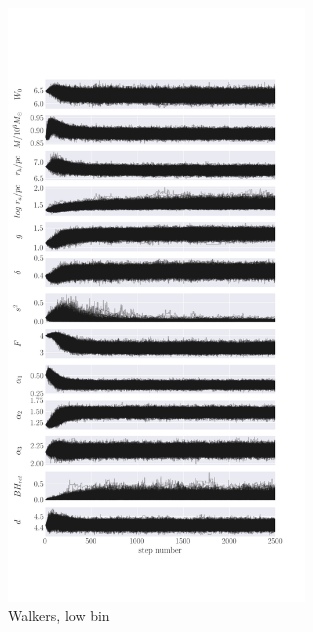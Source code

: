 \begin{figure}
	\begin{center}
		\includegraphics[width=0.7\textwidth]{figures/low_bin_model/walkers.png}
	\end{center}
	\caption{Walkers, low bin}
	\label{fig:high_bin_model_densities}
\end{figure}